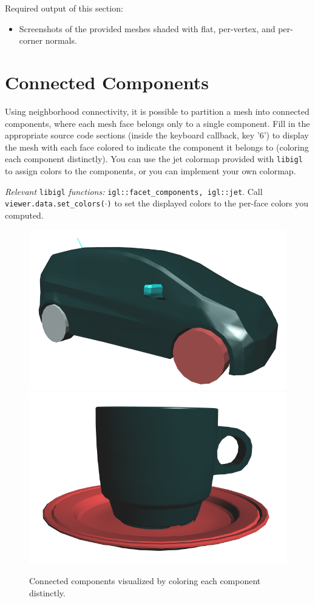 \documentclass[11pt]{amsart}
\begin{document}
\vspace{1cm}
Required output of this section:
\begin{itemize}
\item{Screenshots of the provided meshes shaded with flat, per-vertex, and per-corner normals.}
\end{itemize}


\section{Connected Components}
Using neighborhood connectivity, it is possible to partition a mesh into
connected components, where each mesh face belongs only to a single
component. Fill in the appropriate source code sections (inside the keyboard
callback, key '6') to display the mesh with each face colored to indicate the
component it belongs to (coloring each component distinctly).
You can use the jet colormap provided with \texttt{libigl} to assign colors to
the components, or you can implement your own colormap.

\emph{Relevant} \texttt{libigl} \emph{functions: }
\texttt{igl::facet\_components, igl::jet}. Call
\texttt{viewer.data.set\_colors($\cdot$)} to set the displayed colors to the
per-face colors you computed.

\begin{figure}[h!]
   \centering
   \includegraphics[width=0.6\columnwidth]{car.png} %
\hspace{3cm}
   \includegraphics[width=0.5\columnwidth]{cup.png} %
   \caption{Connected components visualized by coloring each component
    distinctly.}
   \label{fig:conn_comp}
\end{figure}
\end{document}
